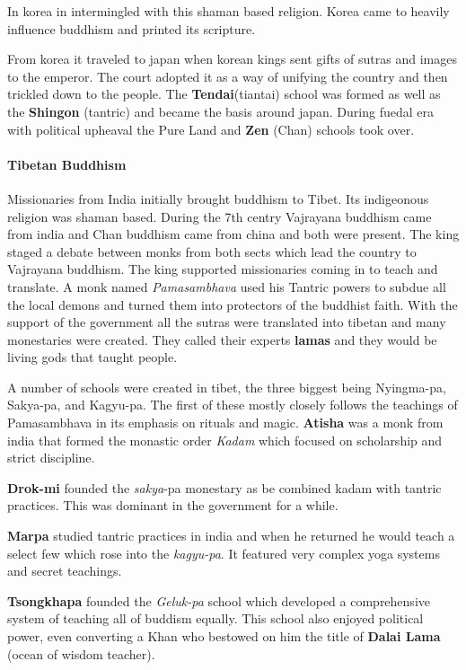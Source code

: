 \documentclass{article}
\begin{document}
In korea in intermingled with this shaman based religion. Korea came to heavily influence buddhism and printed its scripture.

From korea it traveled to japan when korean kings sent gifts of sutras and images to the emperor. The court adopted it as a way of unifying the country and then trickled down to the people. The \textbf{Tendai}(tiantai) school was formed as well as the \textbf{Shingon} (tantric) and became the basis around japan. During fuedal era with political upheaval the Pure Land and \textbf{Zen} (Chan) schools took over.

\paragraph{Tibetan Buddhism}
\label{par:tibetan_buddhism}
Missionaries from India initially brought buddhism to Tibet. Its indigeonous religion was shaman based. During the 7th centry Vajrayana buddhism came from india and Chan buddhism came from china and both were present.  The king staged a debate between monks from both sects which lead the country to Vajrayana buddhism. The king supported missionaries coming in to teach and translate. A monk named \emph{Pamasambhava} used his Tantric powers to subdue all the local demons and turned them into protectors of the buddhist faith. With the support of the government all the sutras were translated into tibetan and many monestaries were created. They called their experts \textbf{lamas} and they would be living gods that taught people.

A number of schools were created in tibet, the three biggest being Nyingma-pa, Sakya-pa, and Kagyu-pa. The first of these mostly closely follows the teachings of Pamasambhava in its emphasis on rituals and magic. \textbf{Atisha} was a monk from india that formed the monastic order \emph{Kadam} which focused on scholarship and strict discipline.

\textbf{Drok-mi} founded the \emph{sakya}-pa monestary  as be combined kadam with tantric practices. This was dominant in the government for a while.

\textbf{Marpa} studied tantric practices in india and when he returned he would teach a select few  which rose into the \emph{kagyu-pa}. It featured very complex yoga systems and secret teachings.

\textbf{Tsongkhapa} founded the \emph{Geluk-pa} school which developed a comprehensive system of teaching all of buddism equally. This school also enjoyed political power, even converting a Khan who bestowed on him the title of \textbf{Dalai Lama} (ocean of wisdom teacher).
\end{document}
